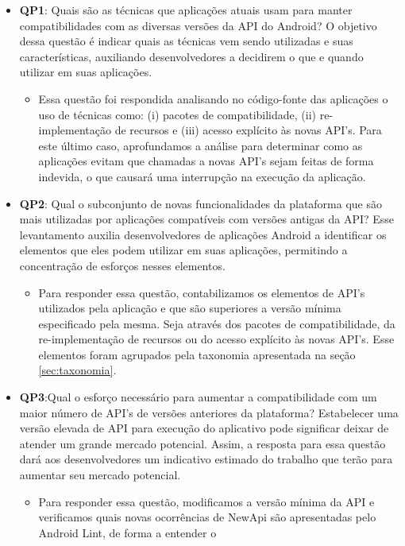 \begin{itemize}
	\item \textbf{QP1}: Quais são as técnicas que aplicações atuais usam para manter
	compatibilidades com as diversas versões da API do Android? O objetivo dessa questão
	é indicar quais as técnicas vem sendo utilizadas e suas características, auxiliando
	desenvolvedores a decidirem o que e quando utilizar em suas aplicações.
		\begin{itemize}
			\item Essa questão foi respondida analisando no código-fonte das aplicações o
			uso de técnicas como: (i) pacotes de compatibilidade, (ii) re-implementação de
			recursos e (iii) acesso explícito às novas API's. Para este último caso,
			aprofundamos a análise para determinar como as aplicações evitam que chamadas
			a novas API's sejam feitas de forma indevida, o que causará uma interrupção na
			execução da aplicação.
		\end{itemize}
	\item \textbf{QP2}: Qual o subconjunto de novas funcionalidades da plataforma que são
	mais utilizadas por aplicações compatíveis com versões antigas da API? Esse levantamento
	auxilia desenvolvedores de aplicações Android a identificar os elementos que eles podem
	utilizar em suas aplicações, permitindo a concentração de esforços nesses elementos.
		\begin{itemize}
			\item Para responder essa questão, contabilizamos os elementos de API's utilizados
			pela aplicação e que são superiores a versão mínima especificado pela mesma. Seja
			através dos pacotes de compatibilidade, da re-implementação de recursos ou do acesso
			explícito às novas API's. Esse elementos foram agrupados pela taxonomia apresentada
			na seção \ref{sec:taxonomia}.
		\end{itemize}
	\item \textbf{QP3}:Qual o esforço necessário para aumentar a compatibilidade com um maior
	número de API's de versões anteriores da plataforma? Estabelecer uma versão elevada de API
	para execução do aplicativo pode significar deixar de atender um grande mercado potencial.
	Assim, a resposta para essa questão dará aos desenvolvedores um indicativo estimado do trabalho
	que terão para aumentar seu mercado potencial.
		\begin{itemize}
			\item Para responder essa questão, modificamos a versão mínima da API e verificamos quais
			novas ocorrências de NewApi são apresentadas pelo Android Lint, de forma a entender o

\end{itemize}
\end{itemize}
